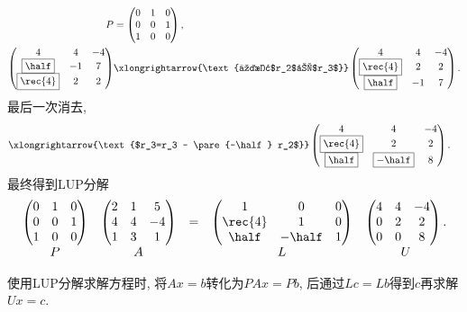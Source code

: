\documentclass{ctexart}
\begin{document}
\begin{ex}
\begin{align*}
        P &= \begin{pmatrix}
            0 & 1 & 0 \\ 0 & 0 & 1 \\ 1 & 0 & 0
        \end{pmatrix}, \\
        \begin{pmatrix}
            4 & 4 & -4 \\ \boxed{\half} & -1 & 7 \\ \boxed{\rec{4}} & 2 & 2
        \end{pmatrix} &\xlongrightarrow{\text{交换$r_2$和$r_3$}} \begin{pmatrix}
            4 & 4 & -4 \\ \boxed{\rec{4}} & 2 & 2 \\ \boxed{\half} & -1 & 7 
        \end{pmatrix}.
    \end{align*}
    最后一次消去,
    \begin{align*}
        & \xlongrightarrow{\text{$r_3=r_3 - \pare{-\half} r_2$}} \begin{pmatrix}
            4 & 4 & -4 \\ \boxed{\rec{4}} & 2 & 2 \\ \boxed{\half} & \boxed{-\half} & 8
        \end{pmatrix}.
    \end{align*}
    最终得到LUP分解
    \[ \begin{array}{ccccc}
        \begin{pmatrix}
            0 & 1 & 0 \\ 0 & 0 & 1 \\ 1 & 0 & 0
        \end{pmatrix}&\begin{pmatrix}
            2 & 1 & 5 \\ 4 & 4 & -4 \\ 1 & 3 & 1
        \end{pmatrix} &=& \begin{pmatrix}
            1 & 0 & 0 \\ \rec{4} & 1 & 0 \\ \half & -\half & 1 \\
        \end{pmatrix} & \begin{pmatrix}
            4 & 4 & -4 \\ 0 & 2 & 2 \\ 0 & 0 & 8
        \end{pmatrix}. \\
        P & A & & L & U
    \end{array} \]
\end{ex}
使用LUP分解求解方程时, 将$Ax=b$转化为$PAx=Pb$, 后通过$Lc=Lb$得到$c$再求解$Ux=c$.
\end{document}
